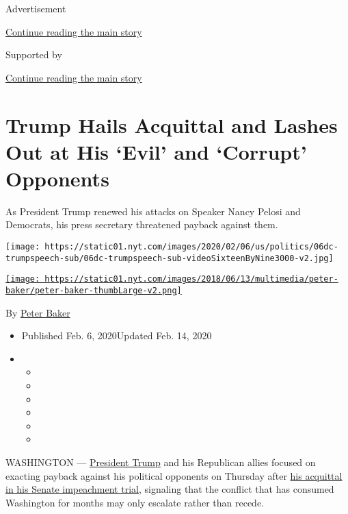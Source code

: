 Advertisement

\protect\hyperlink{after-top}{Continue reading the main story}

Supported by

\protect\hyperlink{after-sponsor}{Continue reading the main story}

\hypertarget{trump-hails-acquittal-and-lashes-out-at-his-evil-and-corrupt-opponents}{%
\section{Trump Hails Acquittal and Lashes Out at His `Evil' and
`Corrupt'
Opponents}\label{trump-hails-acquittal-and-lashes-out-at-his-evil-and-corrupt-opponents}}

As President Trump renewed his attacks on Speaker Nancy Pelosi and
Democrats, his press secretary threatened payback against them.

\texttt{[image: https://static01.nyt.com/images/2020/02/06/us/politics/06dc-trumpspeech-sub/06dc-trumpspeech-sub-videoSixteenByNine3000-v2.jpg]}

\href{https://www.nytimes.com/by/peter-baker}{\texttt{[image: https://static01.nyt.com/images/2018/06/13/multimedia/peter-baker/peter-baker-thumbLarge-v2.png]}}

By \href{https://www.nytimes.com/by/peter-baker}{Peter Baker}

\begin{itemize}
\item
  Published Feb. 6, 2020Updated Feb. 14, 2020
\item
  \begin{itemize}
  \item
  \item
  \item
  \item
  \item
  \item
  \end{itemize}
\end{itemize}

WASHINGTON ---
\href{https://www.nytimes.com/2020/02/14/podcasts/the-daily/trump-acquittal.html?action=click\&module=Briefings\&pgtype=Homepage}{President
Trump} and his Republican allies focused on exacting payback against his
political opponents on Thursday after
\href{https://www.nytimes.com/2020/02/05/us/politics/trump-acquitted-impeachment.html}{his
acquittal in his Senate impeachment trial}, signaling that the conflict
that has consumed Washington for months may only escalate rather than
recede.

